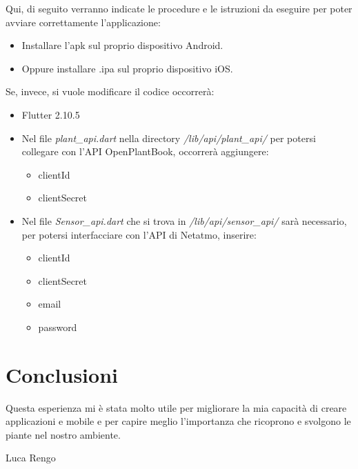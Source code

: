 \documentclass[a4paper,12pt]{report}
\begin{document}
\textsf{\small Qui, di seguito verranno indicate le procedure e le istruzioni da eseguire per poter avviare correttamente l'applicazione: }

\begin{itemize}
	\item \textsf{\small Installare l'apk sul proprio dispositivo Android.}
	\item \textsf{\small Oppure installare .ipa sul proprio dispositivo iOS.}
\end{itemize}

\textsf{\small Se, invece, si vuole modificare il codice occorrerà:} %

\begin{itemize}
	\item \textsf{\small Flutter 2.10.5}
	\item \textsf{\small Nel file \emph{plant\_api.dart} nella directory \emph{/lib/api/plant\_api/} per potersi collegare con l'API OpenPlantBook, occorrerà aggiungere: }
	\begin{itemize}
		\item \textsf{\small clientId}
		\item \textsf{\small clientSecret}
	\end{itemize}
	\item \textsf{\small Nel file \emph{Sensor\_api.dart} che si trova in \emph{/lib/api/sensor\_api/} sarà necessario, per potersi interfacciare con l'API di Netatmo, inserire: }
	\begin{itemize}
		\item \textsf{\small clientId}
		\item \textsf{\small clientSecret}
		\item \textsf{\small email}
		\item \textsf{\small password}
	\end{itemize}
\end{itemize}


\section{Conclusioni}

\textsf{\small Questa esperienza mi è stata molto utile per migliorare la mia capacità di creare applicazioni e mobile e per capire meglio l'importanza che ricoprono e svolgono le piante nel nostro ambiente.}\break

\textsf{\small Luca Rengo}

\end{document}
